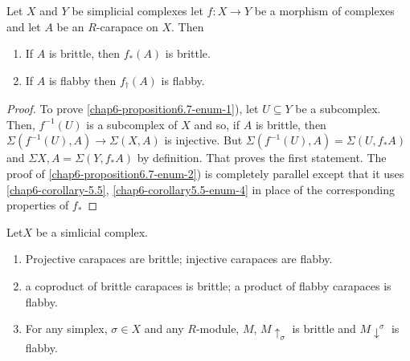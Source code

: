 \begin{secprop}\label{chap6-proposition-6.7}
Let $X$ and $Y$ be simplicial complexes let $f: X \rightarrow Y$ be a morphism of complexes and let $A$ be an $R$-carapace on $X$. Then
\begin{enumerate}[(1)]
\item If $A$ is brittle, then $f_{*}(A)$ is brittle.\label{chap6-proposition6.7-enum-1}
\item If $A$ is flabby then $f_{\dagger}(A)$ is flabby. \label{chap6-proposition6.7-enum-2}
\end{enumerate}
\end{secprop}

\begin{proof}
To prove \ref{chap6-proposition6.7-enum-1}), let $U\subseteq Y$ be a subcomplex. Then, $f^{-1}(U)$ is a subcomplex of $X$ and so, if $A$ is brittle, then $\Sigma(f^{-1}(U), A) \rightarrow \Sigma(X, A)$ is injective. But $\Sigma(f^{-1}(U), A)=\Sigma(U, f_{*}A)$ and $\Sigma{X, A} = \Sigma(Y, f_{*}A)$ by definition. That proves the first statement. The proof of \ref{chap6-proposition6.7-enum-2}) is completely parallel except that it uses \ref{chap6-corollary-5.5},
\ref{chap6-corollary5.5-enum-4} in place of the corresponding properties of $f_{*}$
\end{proof}

\begin{secprop}\label{chap6-proposition-6.8}
Let\pageoriginale $X$ be a simlicial complex.
\begin{enumerate}[(1)]
\item Projective carapaces are brittle; injective carapaces are flabby.\label{chap6-proposition6.8-enum-1}
\item a coproduct of brittle carapaces is brittle; a product of flabby carapaces is flabby.\label{chap6-proposition6.8-enum-2}
\item For any simplex, $\sigma \in X $ and any $R$-module, $M$, $M \uparrow_{\sigma}$ is brittle and $M\downarrow^{\sigma}$ is flabby.  \label{chap6-proposition6.8-enum-3}
\end{enumerate}
\end{secprop}

